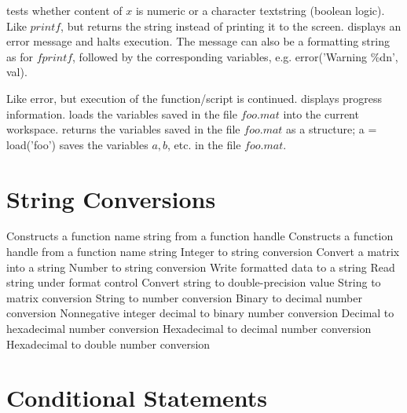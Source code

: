 	{tests whether content of $x$ is numeric or a character textstring (boolean logic).}
	{Like $printf$, but returns the string instead of printing it to the screen.}
	{displays an error message and halts execution. The message
can also be a formatting string as for $fprintf$, followed by the corresponding
variables, e.g. error('Warning \bs \%d\bs n', val).}

	{Like error, but execution of the function/script is continued. }
	{displays progress information.}
	{loads the variables saved in the file $foo.mat$ into the current workspace.}
	{returns the variables saved in the file $foo.mat$ as a structure;}
	{a = load('foo')}
	{saves the variables $a, b$, etc. in the file $foo.mat$.}

\section{String Conversions}{}
	{Constructs a function name string from a function handle}
	{Constructs a function handle from a function name string}
	{Integer to string conversion}
	{Convert a matrix into a string}
	{Number to string conversion}
	{Write formatted data to a string}
	{Read string under format control}
	{Convert string to double-precision value}
	{String to matrix conversion}
	{String to number conversion}
	{Binary to decimal number conversion}
	{Nonnegative integer decimal to binary number conversion}
	{Decimal to hexadecimal number conversion}
	{Hexadecimal to decimal number conversion}
	{Hexadecimal to double number conversion}

\section{Conditional Statements}{}

